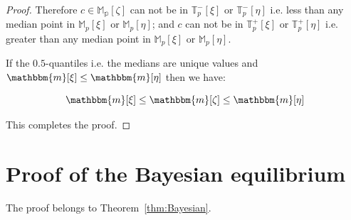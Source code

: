 \documentclass{article}
\theoremstyle{definition}
\begin{document}
\begin{proof}
    Therefore $c \in \mathbb{M_p}[\zeta]$ can not be in $\mathbb{T}^{-}_p[\xi]$ or $\mathbb{T}^{-}_p[\eta]$ i.e. less than any median point in $\mathbb{M}_p[\xi]$ or $\mathbb{M}_p[\eta]$;
    and $c$ can not be in $\mathbb{T}^{+}_p[\xi]$ or $\mathbb{T}^{+}_p[\eta]$ i.e. greater than any median point in $\mathbb{M}_p[\xi]$ or $\mathbb{M}_p[\eta]$.

    If the $0.5$-quantiles i.e. the medians are unique values and $\mathbbm{m}[\xi] \le \mathbbm{m}[\eta]$ then we have:

    \begin{equation}
        \mathbbm{m}[\xi]
        \le
        \mathbbm{m}[\zeta]
        \le
        \mathbbm{m}[\eta]
    \end{equation}

    This completes the proof.
    
\end{proof}


\section{Proof of the Bayesian equilibrium}

The proof belongs to Theorem~\ref{thm:Bayesian}.
\end{document}

